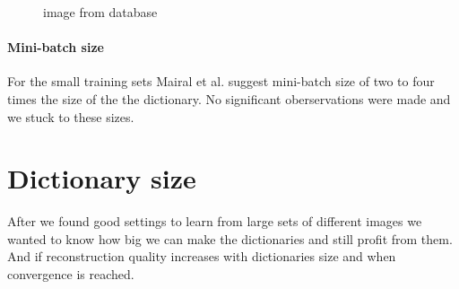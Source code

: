 \begin{figure}[H]
\centering
{}
\hspace{5mm}
\hspace{5mm}
\hspace{5mm}
\hspace{5mm}
\caption{image from database}
\label{fig:USC-SIPI}
\end{figure}

\paragraph{Mini-batch size}
For the small training sets Mairal et al. suggest mini-batch size of two to four
times the size of the the dictionary. No significant oberservations were made
and we stuck to these sizes. 

\newpage
\section{Dictionary size}
After we found good settings to learn from large sets of different images we
wanted to know how big we can make the dictionaries and still profit from them.
And if reconstruction quality increases with dictionaries size and when
convergence is reached.

